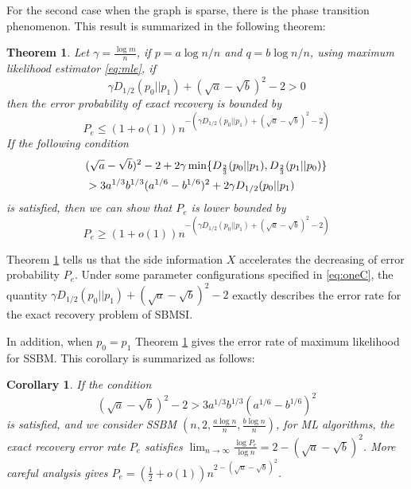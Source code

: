 \documentclass[conference]{IEEEtran}
\newtheorem{theorem}{Theorem}
\newtheorem{corollary}{Corollary}
\begin{document}
For the second case when the graph is sparse, there is the phase transition phenomenon. This result
is summarized
in the following theorem:
\begin{theorem}\label{thm:Pe}
Let $\gamma = \frac{\log m}{n}$, if $p = a \log n /n$ and $q = b \log n / n$, using maximum likelihood estimator \eqref{eq:mle},
if
\begin{equation}\label{eq:positive_condition}
\gamma D_{1/2}(p_0||p_1) + (\sqrt{a} - \sqrt{b})^2-2 > 0
\end{equation}
then the error probability
of exact recovery is bounded by
\begin{equation}\label{eq:PeMain}
P_e \leq (1+o(1)) n^{-\left(\gamma D_{1/2}(p_0||p_1) + (\sqrt{a} - \sqrt{b})^2-2\right)}
\end{equation}
If the following condition
\begin{align}
&(\sqrt{a}-\sqrt{b})^2-2 + 2\gamma \min \{D_{\frac{2}{3}}(p_0||p_1), D_{\frac{2}{3}}(p_1||p_0) \} \notag \\
&> 3a^{1/3}b^{1/3}(a^{1/6}-b^{1/6})^2 + 2\gamma D_{1/2}(p_0||p_1)\label{eq:oneC}
\end{align}
is satisfied, then we can show that $P_e$ is lower bounded by
\begin{equation}\label{eq:PeMainL}
P_e \geq (1+o(1)) n^{-\left(\gamma D_{1/2}(p_0||p_1) + (\sqrt{a} - \sqrt{b})^2-2\right)}
\end{equation}
\end{theorem}
Theorem \ref{thm:Pe} tells us that the side information $X$ accelerates the
decreasing of error probability $P_e$. Under some parameter configurations specified in \eqref{eq:oneC},
the quantity $\gamma D_{1/2}(p_0||p_1) + (\sqrt{a} - \sqrt{b})^2-2$
exactly describes the error rate for the exact recovery problem of SBMSI.

In addition, when $p_0=p_1$
Theorem \ref{thm:Pe} gives the error rate of maximum likelihood for SSBM. This corollary is
summarized as follows:
\begin{corollary}
If the condition
\begin{equation}
(\sqrt{a}-\sqrt{b})^2-2 > 3a^{1/3}b^{1/3}(a^{1/6}-b^{1/6})^2
\end{equation}
is satisfied,
 and we consider SSBM $(n, 2, \frac{a\log n}{n}, \frac{b \log n}{n})$, for ML algorithms, the exact recovery error rate $P_e$ satisfies
$\lim_{n\to \infty} \frac{\log P_e}{\log n} =2-(\sqrt{a} - \sqrt{b})^2$.
More careful analysis gives  $P_e = (\frac{1}{2}+o(1))n^{2-(\sqrt{a} - \sqrt{b})^2}$.
\end{corollary}
\end{document}

